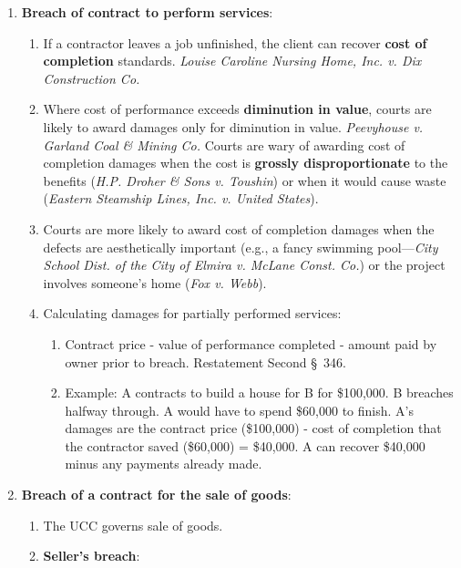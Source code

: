 \begin{enumerate}
    \item \textbf{Breach of contract to perform services}:
    \begin{enumerate}
        \item If a contractor leaves a job unfinished, the client can recover 
        \textbf{cost of completion} standards. \emph{Louise Caroline Nursing 
        Home, Inc. v. Dix Construction Co.}
        \item Where cost of performance exceeds \textbf{diminution in value}, 
        courts are likely to award damages only for diminution in value.  
        \emph{Peevyhouse v. Garland Coal \& Mining Co.} Courts are wary of 
        awarding cost of completion damages when the cost is \textbf{grossly 
        disproportionate} to the benefits (\emph{H.P. Droher \& Sons v. 
        Toushin}) or when it would cause waste (\emph{Eastern Steamship Lines, 
        Inc. v.  United States}).
        \item Courts are more likely to award cost of completion damages when 
        the defects are aesthetically important (e.g., a fancy swimming 
        pool---\emph{City School Dist. of the City of Elmira v.  McLane Const.  
        Co.}) or the project involves someone's home (\emph{Fox v. Webb}).  
        \item Calculating damages for partially performed services:
        \begin{enumerate}
            \item Contract price - value of performance completed - amount 
            paid by owner prior to breach. Restatement Second \S\ 346.
            \item Example: A contracts to build a house for B for \$100,000. B 
            breaches halfway through. A would have to spend \$60,000 to 
            finish.  A's damages are the contract price (\$100,000) - cost of 
            completion that the contractor saved (\$60,000) = \$40,000. A can 
            recover \$40,000 minus any payments already made.
        \end{enumerate}
    \end{enumerate}
    \item \textbf{Breach of a contract for the sale of goods}:
    \begin{enumerate}
        \item The UCC governs sale of goods.
        \item \textbf{Seller's breach}:
        \begin{enumerate}

\end{enumerate}
\end{enumerate}
\end{enumerate}
